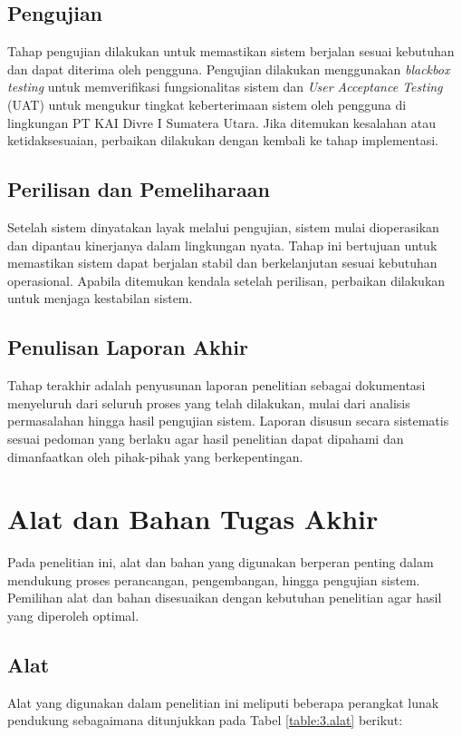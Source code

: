 \subsection{Pengujian} \label{III.Pengujian}
Tahap pengujian dilakukan untuk memastikan sistem berjalan sesuai kebutuhan dan dapat diterima oleh pengguna. Pengujian dilakukan menggunakan \textit{blackbox testing} untuk memverifikasi fungsionalitas sistem dan \textit{User Acceptance Testing} (UAT) untuk mengukur tingkat keberterimaan sistem oleh pengguna di lingkungan PT KAI Divre I Sumatera Utara. Jika ditemukan kesalahan atau ketidaksesuaian, perbaikan dilakukan dengan kembali ke tahap implementasi. \par

\subsection{Perilisan dan Pemeliharaan} \label{III.Perilisan}
Setelah sistem dinyatakan layak melalui pengujian, sistem mulai dioperasikan dan dipantau kinerjanya dalam lingkungan nyata. Tahap ini bertujuan untuk memastikan sistem dapat berjalan stabil dan berkelanjutan sesuai kebutuhan operasional. Apabila ditemukan kendala setelah perilisan, perbaikan dilakukan untuk menjaga kestabilan sistem. \par

\subsection{Penulisan Laporan Akhir} \label{III.Laporan}
Tahap terakhir adalah penyusunan laporan penelitian sebagai dokumentasi menyeluruh dari seluruh proses yang telah dilakukan, mulai dari analisis permasalahan hingga hasil pengujian sistem. Laporan disusun secara sistematis sesuai pedoman yang berlaku agar hasil penelitian dapat dipahami dan dimanfaatkan oleh pihak-pihak yang berkepentingan. \par

\section{Alat dan Bahan Tugas Akhir} \label{III.AlatBahan}
Pada penelitian ini, alat dan bahan yang digunakan berperan penting dalam mendukung proses perancangan, pengembangan, hingga pengujian sistem. Pemilihan alat dan bahan disesuaikan dengan kebutuhan penelitian agar hasil yang diperoleh optimal.

\subsection{Alat} \label{III.Alat}
Alat yang digunakan dalam penelitian ini meliputi beberapa perangkat lunak pendukung sebagaimana ditunjukkan pada Tabel \ref{table:3.alat} berikut:

